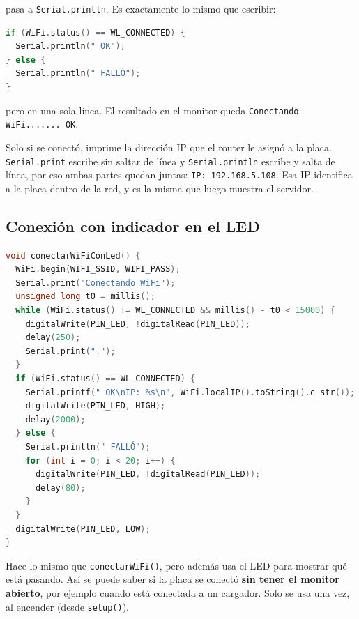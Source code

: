 \documentclass[11pt,a4paper]{article}
\begin{document}
\begin{description}[leftmargin=*,style=nextline]
        pasa a \texttt{Serial.println}. Es exactamente lo mismo que escribir:
\begin{lstlisting}[language=C++,numbers=none]
if (WiFi.status() == WL_CONNECTED) {
  Serial.println(" OK");
} else {
  Serial.println(" FALLÓ");
}
\end{lstlisting}
        pero en una sola línea. El resultado en el monitor queda
        \texttt{Conectando WiFi....... OK}.
  \item[Líneas 11--14 --- mostrar la IP]
        Solo si se conectó, imprime la dirección IP que el router le asignó a la
        placa. \texttt{Serial.print} escribe sin saltar de línea y
        \texttt{Serial.println} escribe y salta de línea, por eso ambas partes
        quedan juntas: \texttt{IP: 192.168.5.108}. Esa IP identifica a la placa
        dentro de la red, y es la misma que luego muestra el servidor.
\end{description}

\subsection{Conexión con indicador en el LED}

\begin{lstlisting}[language=C++]
void conectarWiFiConLed() {
  WiFi.begin(WIFI_SSID, WIFI_PASS);
  Serial.print("Conectando WiFi");
  unsigned long t0 = millis();
  while (WiFi.status() != WL_CONNECTED && millis() - t0 < 15000) {
    digitalWrite(PIN_LED, !digitalRead(PIN_LED));
    delay(250);
    Serial.print(".");
  }
  if (WiFi.status() == WL_CONNECTED) {
    Serial.printf(" OK\nIP: %s\n", WiFi.localIP().toString().c_str());
    digitalWrite(PIN_LED, HIGH);
    delay(2000);
  } else {
    Serial.println(" FALLÓ");
    for (int i = 0; i < 20; i++) {
      digitalWrite(PIN_LED, !digitalRead(PIN_LED));
      delay(80);
    }
  }
  digitalWrite(PIN_LED, LOW);
}
\end{lstlisting}

Hace lo mismo que \texttt{conectarWiFi()}, pero además usa el LED para mostrar qué
está pasando. Así se puede saber si la placa se conectó \textbf{sin tener el
monitor abierto}, por ejemplo cuando está conectada a un cargador. Solo se usa una
vez, al encender (desde \texttt{setup()}).
\end{document}
